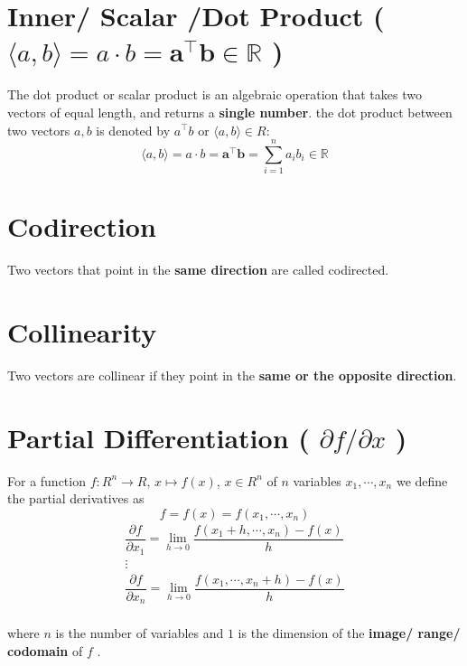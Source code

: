 \section{Inner/ Scalar /Dot Product ( $\langle a, b \rangle =a\cdot b = \mathbf{a^\top b} \in \mathbb{R}$ ) \cite{mfml-1,wiki/Dot_product}} \label{vector: Inner/ Scalar /Dot Product}

The dot product or scalar product is an algebraic operation that takes two vectors of equal length, and returns a \textbf{single number}.
the dot product between two vectors $a, b$ is denoted by $a^\top b$ or $\langle a, b\rangle \in R$:
\[
    \displaystyle
    \langle a, b \rangle =
    a\cdot b = 
    \mathbf{a^\top b} =
    \sum_{i=1}^{n} a_i b_i
    \in \mathbb{R}
\]


\section{Codirection}\label{Codirection}
Two vectors that point in the \textbf{same direction} are called codirected. 


\section{Collinearity}\label{Collinearity}
Two vectors are collinear if they point in the \textbf{same or the opposite direction}.


\section{Partial Differentiation ( $\partial f/\partial x$ )} \label{vectors: Partial Differentiation}

For a function $f : R^n \to R$, $x \mapsto f(x)$, $x \in R^n$ of $n$ variables $x_1, \cdots , x_n$ we define the partial derivatives as
\[
    f = f(x) = f(x_1, \cdots , x_n)
\]
\[
    \displaystyle
    \begin{matrix}
    \dfrac{\partial f}{\partial x_1} = 
    \lim_{h\to 0} \dfrac{f(x_1+h, \cdots , x_n) - f(x)}{h} \\
    \vdots\\
    \dfrac{\partial f}{\partial x_n} = 
    \lim_{h\to 0} \dfrac{f(x_1, \cdots , x_n+h) - f(x)}{h} \\
    \end{matrix}
\]

where $n$ is the number of variables and $1$ is the dimension of the \textbf{image/ range/ codomain} of $f$ .



